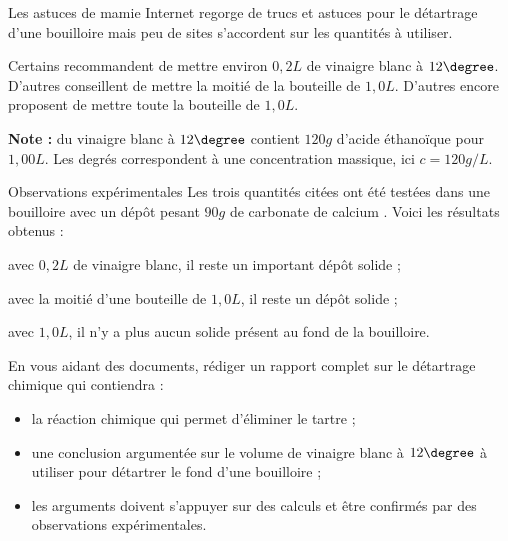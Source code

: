 \begin{doc}{Les astuces de mamie}
  \label{doc:astuces_detartrage}
  Internet regorge de trucs et astuces pour le détartrage d'une bouilloire mais peu de sites s'accordent sur les quantités à utiliser.

  Certains recommandent de mettre environ $0,\!2 \unit{L}$ de vinaigre blanc à $12\degree$.
  D'autres conseillent de mettre la moitié de la bouteille de $1,\!0 \unit{L}$.
  D'autres encore proposent de mettre toute la bouteille de $1,\!0 \unit{L}$.
  
  \textbf{Note :} du vinaigre blanc à $12\degree$ contient $120\unit{g}$ d'acide éthanoïque pour $1,\!00\unit{L}$.
  Les degrés correspondent à une concentration massique, ici $c = 120 \unit{g / L}$.
\end{doc}

\begin{doc}{Observations expérimentales}
  \label{doc:observations_detartrage}
  Les trois quantités citées ont été testées dans une bouilloire avec un dépôt pesant $90 \unit{g}$ de carbonate de calcium .
  Voici les résultats obtenus :
  \begin{listePoints}
    \item avec $0,\!2 \unit{L}$ de vinaigre blanc, il reste un important dépôt solide ;
    \item avec la moitié d'une bouteille de $1,\!0 \unit{L}$, il reste un dépôt solide ;
    \item avec $1,\!0 \unit{L}$, il n'y a plus aucun solide présent au fond de la bouilloire.
  \end{listePoints}
\end{doc}


%
\numeroQuestion
En vous aidant des documents, rédiger un rapport complet sur le détartrage chimique qui contiendra :
\begin{itemize}
  \item la réaction chimique qui permet d'éliminer le tartre ;
  \item une conclusion argumentée sur le volume de vinaigre blanc à $12\degree$ à utiliser pour détartrer le fond d'une bouilloire ;
  \item les arguments doivent s'appuyer sur des calculs et être confirmés par des observations expérimentales.
\end{itemize}


%

